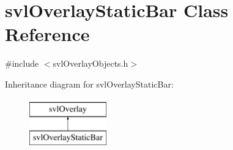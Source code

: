\hypertarget{classsvl_overlay_static_bar}{}\section{svl\+Overlay\+Static\+Bar Class Reference}
\label{classsvl_overlay_static_bar}


{\ttfamily \#include $<$svl\+Overlay\+Objects.\+h$>$}

Inheritance diagram for svl\+Overlay\+Static\+Bar\+:\begin{figure}[H]
\begin{center}
\leavevmode
\includegraphics[height=2.000000cm]{d2/d53/classsvl_overlay_static_bar}
\end{center}
\end{figure}
